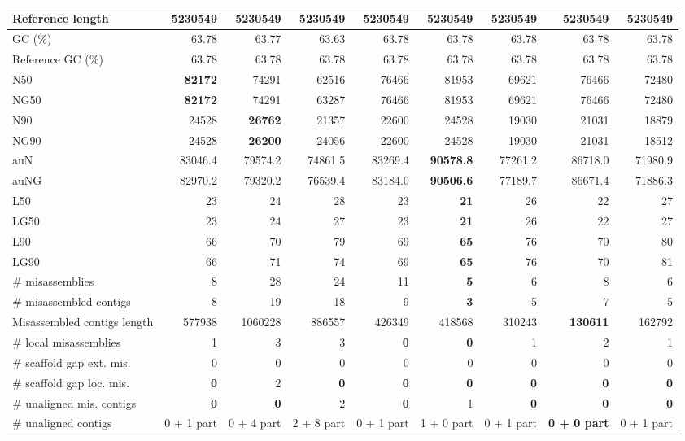 \documentclass[12pt,a4paper]{article}
\begin{document}
\begin{table}[ht]
\begin{center}
\begin{tabular}{|l*{8}{|r}|}
Reference length & 5230549 & 5230549 & 5230549 & 5230549 & 5230549 & 5230549 & 5230549 & 5230549 \\ \hline
GC (\%) & 63.78 & 63.77 & 63.63 & 63.78 & 63.78 & 63.78 & 63.78 & 63.78 \\ \hline
Reference GC (\%) & 63.78 & 63.78 & 63.78 & 63.78 & 63.78 & 63.78 & 63.78 & 63.78 \\ \hline
N50 & {\bf 82172} & 74291 & 62516 & 76466 & 81953 & 69621 & 76466 & 72480 \\ \hline
NG50 & {\bf 82172} & 74291 & 63287 & 76466 & 81953 & 69621 & 76466 & 72480 \\ \hline
N90 & 24528 & {\bf 26762} & 21357 & 22600 & 24528 & 19030 & 21031 & 18879 \\ \hline
NG90 & 24528 & {\bf 26200} & 24056 & 22600 & 24528 & 19030 & 21031 & 18512 \\ \hline
auN & 83046.4 & 79574.2 & 74861.5 & 83269.4 & {\bf 90578.8} & 77261.2 & 86718.0 & 71980.9 \\ \hline
auNG & 82970.2 & 79320.2 & 76539.4 & 83184.0 & {\bf 90506.6} & 77189.7 & 86671.4 & 71886.3 \\ \hline
L50 & 23 & 24 & 28 & 23 & {\bf 21} & 26 & 22 & 27 \\ \hline
LG50 & 23 & 24 & 27 & 23 & {\bf 21} & 26 & 22 & 27 \\ \hline
L90 & 66 & 70 & 79 & 69 & {\bf 65} & 76 & 70 & 80 \\ \hline
LG90 & 66 & 71 & 74 & 69 & {\bf 65} & 76 & 70 & 81 \\ \hline
\# misassemblies & 8 & 28 & 24 & 11 & {\bf 5} & 6 & 8 & 6 \\ \hline
\# misassembled contigs & 8 & 19 & 18 & 9 & {\bf 3} & 5 & 7 & 5 \\ \hline
Misassembled contigs length & 577938 & 1060228 & 886557 & 426349 & 418568 & 310243 & {\bf 130611} & 162792 \\ \hline
\# local misassemblies & 1 & 3 & 3 & {\bf 0} & {\bf 0} & 1 & 2 & 1 \\ \hline
\# scaffold gap ext. mis. & 0 & 0 & 0 & 0 & 0 & 0 & 0 & 0 \\ \hline
\# scaffold gap loc. mis. & {\bf 0} & 2 & {\bf 0} & {\bf 0} & {\bf 0} & {\bf 0} & {\bf 0} & {\bf 0} \\ \hline
\# unaligned mis. contigs & {\bf 0} & {\bf 0} & 2 & {\bf 0} & 1 & {\bf 0} & {\bf 0} & {\bf 0} \\ \hline
\# unaligned contigs & 0 + 1 part & 0 + 4 part & 2 + 8 part & 0 + 1 part & 1 + 0 part & 0 + 1 part & {\bf 0 + 0 part} & 0 + 1 part \\ \hline

\end{tabular}
\end{center}
\end{table}
\end{document}
